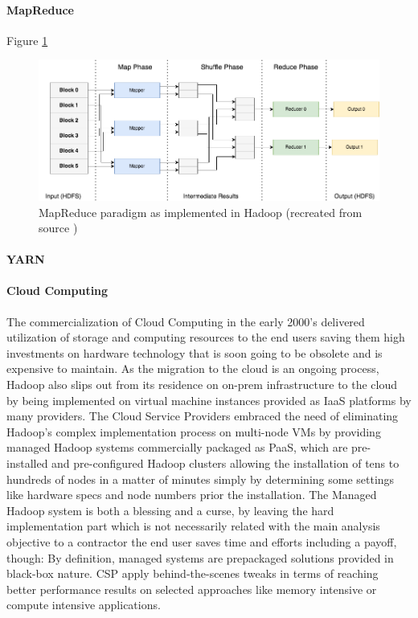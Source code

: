 \documentclass[review]{elsarticle}
\begin{document}
\paragraph{MapReduce} Figure \ref{fig:MapReduce}

\begin{figure}[h!]
	\includegraphics[width=\textwidth]{MapReduce}
	\caption{MapReduce paradigm as implemented in Hadoop (recreated from source \cite{schatzle_giant_nodate})}
	\label{fig:MapReduce}
	\centering
\end{figure}

\paragraph{YARN}

\paragraph{Cloud Computing}The commercialization of Cloud Computing in the early 2000's \cite{noauthor_announcing_nodate} delivered utilization of storage and computing resources to the end users saving them high investments on hardware technology that is soon going to be obsolete and is expensive to maintain. As the migration to the cloud is an ongoing process, Hadoop also slips out from its residence on on-prem infrastructure to the cloud by being implemented on virtual machine instances provided as IaaS platforms by many providers. The Cloud Service Providers embraced the need of eliminating Hadoop's complex implementation process on multi-node VMs by providing managed Hadoop systems commercially packaged as PaaS, which are pre-installed and pre-configured Hadoop clusters allowing the installation of tens to hundreds of nodes in a matter of minutes simply by determining some settings like hardware specs and node numbers prior the installation. The Managed Hadoop system is both a blessing and a curse, by leaving the hard implementation part which is not necessarily related with the main analysis objective to a contractor the end user saves time and efforts including a payoff, though: By definition, managed systems are prepackaged solutions provided in black-box nature. CSP apply behind-the-scenes tweaks in terms of reaching better performance results on selected approaches like memory intensive or compute intensive applications.
\end{document}

